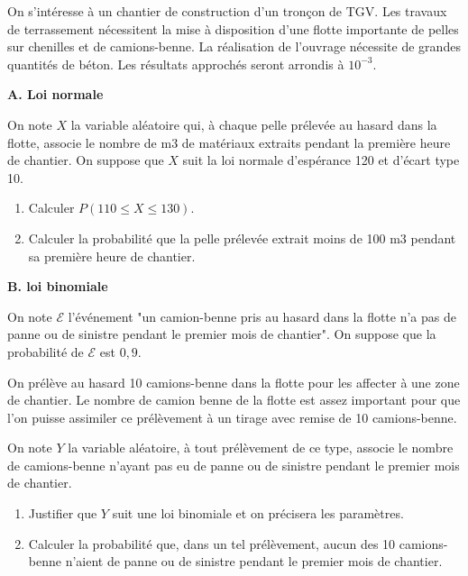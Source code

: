 \begin{exercice_cours}[\quad]{}

On s'intéresse à un chantier de construction d'un tronçon de TGV. Les travaux de terrassement nécessitent la mise à disposition d'une flotte importante de pelles sur chenilles et de camions-benne. La réalisation de l'ouvrage nécessite de grandes quantités de béton.
Les résultats approchés seront arrondis à $10^{-3}$.

\medskip

\textbf{A. Loi normale}

\medskip

On note $X$ la variable aléatoire qui, à chaque pelle prélevée au hasard dans la flotte, associe le nombre de m3 de matériaux extraits pendant la première heure de chantier.
On suppose que $X$ suit la loi normale d'espérance 120 et d'écart type 10.

\begin{enumerate}
	\item Calculer $P(110 \leq X \leq 130)$.
	\item  Calculer la probabilité que la pelle prélevée extrait moins de 100 m3 pendant sa première heure de chantier.
\end{enumerate}

\medskip

\textbf{B. loi binomiale}
\medskip

On note $\mathcal{E}$ l'événement "un camion-benne pris au hasard dans la flotte n'a pas de panne ou de sinistre pendant le premier mois de chantier". On suppose que la probabilité de $\mathcal{E}$ est $0,9$.

On prélève au hasard 10 camions-benne dans la flotte pour les affecter à une zone de chantier. Le nombre de camion benne de la flotte est assez important pour que l'on puisse assimiler ce prélèvement à un tirage avec remise de 10 camions-benne.

On note $Y$ la variable aléatoire, à tout prélèvement de ce type, associe le nombre de camions-benne n'ayant pas eu de panne ou de sinistre pendant le premier mois de chantier.

\begin{enumerate}
	\item Justifier que $Y$ suit une loi binomiale et on précisera les paramètres.
	\item Calculer la probabilité que, dans un tel prélèvement, aucun des 10 camions-benne n'aient de panne ou de sinistre pendant le premier mois de chantier.
\end{enumerate}
	\end{exercice_cours}


